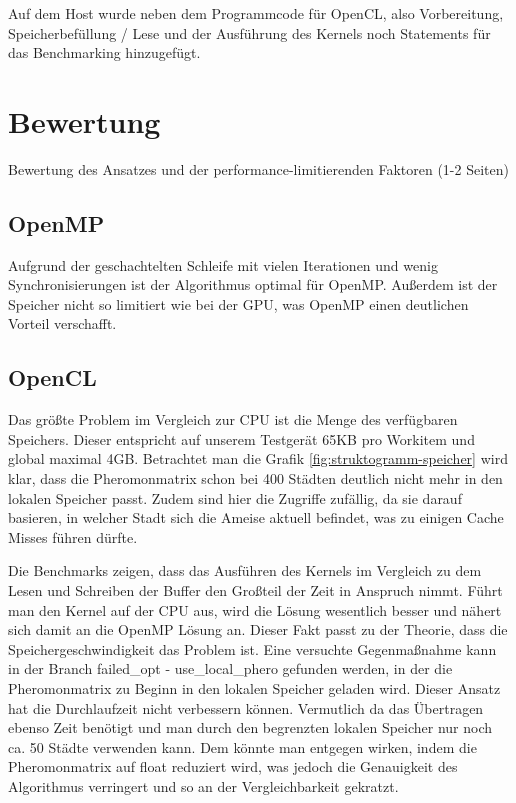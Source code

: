 Auf dem Host wurde neben dem Programmcode für OpenCL, also Vorbereitung, Speicherbefüllung / Lese und der Ausführung des Kernels noch Statements für das Benchmarking hinzugefügt.

\section{Bewertung}
Bewertung des Ansatzes und der performance-limitierenden Faktoren (1-2 Seiten)

\subsection{OpenMP}
Aufgrund der geschachtelten Schleife mit vielen Iterationen und wenig Synchronisierungen ist der Algorithmus optimal für OpenMP.
Außerdem ist der Speicher nicht so limitiert wie bei der GPU, was OpenMP einen deutlichen Vorteil verschafft.

\subsection{OpenCL}
Das größte Problem im Vergleich zur CPU ist die Menge des verfügbaren Speichers.
Dieser entspricht auf unserem Testgerät 65KB pro Workitem und global maximal 4GB.
Betrachtet man die Grafik \ref{fig:struktogramm-speicher} wird klar, dass die Pheromonmatrix schon bei 400 Städten deutlich nicht mehr in den lokalen Speicher passt.
Zudem sind hier die Zugriffe zufällig, da sie darauf basieren, in welcher Stadt sich die Ameise aktuell befindet, was zu einigen Cache Misses führen dürfte.

Die Benchmarks zeigen, dass das Ausführen des Kernels im Vergleich zu dem Lesen und Schreiben der Buffer den Großteil der Zeit in Anspruch nimmt.
Führt man den Kernel auf der CPU aus, wird die Lösung wesentlich besser und nähert sich damit an die OpenMP Lösung an.
Dieser Fakt passt zu der Theorie, dass die Speichergeschwindigkeit das Problem ist.
Eine versuchte Gegenmaßnahme kann in der Branch failed\_opt - use\_local\_phero gefunden werden, in der die Pheromonmatrix zu Beginn in den lokalen Speicher geladen wird.
Dieser Ansatz hat die Durchlaufzeit nicht verbessern können.
Vermutlich da das Übertragen ebenso Zeit benötigt und man durch den begrenzten lokalen Speicher nur noch ca. 50 Städte verwenden kann.
Dem könnte man entgegen wirken, indem die Pheromonmatrix auf float reduziert wird, was jedoch die Genauigkeit des Algorithmus verringert und so an der Vergleichbarkeit gekratzt.

